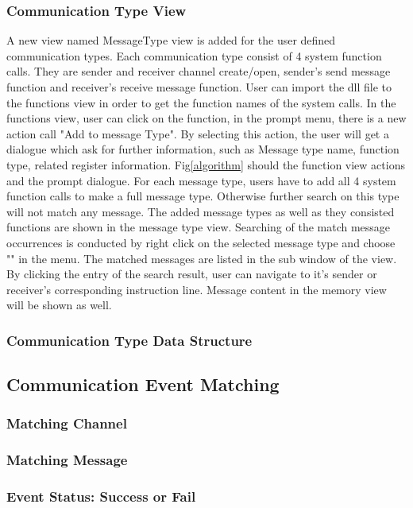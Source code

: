 \documentclass[paper=a4, fontsize=11pt]{scrartcl}
\numberwithin{equation}{section}		%
\numberwithin{figure}{section}			%
\numberwithin{table}{section}				%
\begin{document}
\subsubsection{Communication Type View}
A new view named MessageType view is added for the user defined communication types. Each communication type consist of 4 system function calls. They are sender and receiver channel create/open, sender's send message function and receiver's receive message function.  User can import the dll file to the functions view in order to get the function names of the system calls. In the functions view, user can click on the function, in the prompt menu, there is a new action call "Add to message Type". By selecting this action, the user will get  a dialogue which ask for further information, such as Message type name, function type, related register information. Fig\ref{algorithm} should the function view actions and the prompt dialogue. For each message type, users have to add all 4 system function calls to make a full message type. Otherwise further search on this type will not match any message.
The added message types as well as they consisted functions are shown in the message type view. Searching of the match message occurrences is conducted by right click on the selected message type and choose "" in the menu. The matched messages are listed in the sub window of the view. By clicking the entry of the search  result, user can navigate to it's sender or receiver's corresponding instruction line. Message content in the memory view will be shown as well.
\subsubsection{Communication Type Data Structure}

\subsection{Communication Event Matching}
\subsubsection{Matching Channel}
\subsubsection{Matching Message}
\subsubsection{Event Status: Success or Fail}
\end{document}
